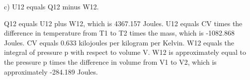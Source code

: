 c) U12 equals Q12 minus W12.

Q12 equals U12 plus W12, which is 4367.157 Joules.
U12 equals CV times the difference in temperature from T1 to T2 times the mass, which is -1082.868 Joules.
CV equals 0.633 kilojoules per kilogram per Kelvin.
W12 equals the integral of pressure p with respect to volume V.
W12 is approximately equal to the pressure p times the difference in volume from V1 to V2, which is approximately -284.189 Joules.